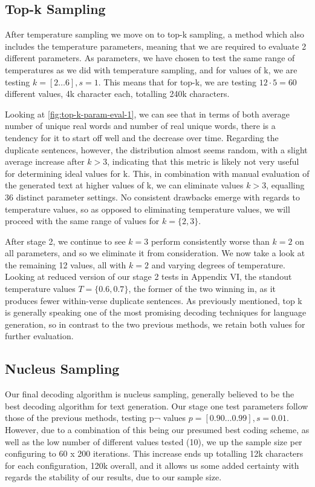 \subsection{Top-k Sampling}
\label{sec:tuningtopk}

After temperature sampling we move on to top-k sampling, a method which also includes the temperature parameters, meaning that we are required to evaluate 2 different parameters. As parameters, we have chosen to test the same range of temperatures as we did with temperature sampling, and for values of k, we are testing $k=[2 \ldots 6],s=1$. This means that for top-k, we are testing $12 \cdot 5 = 60$ different values, 4k character each, totalling 240k characters.

Looking at \cref{fig:top-k-param-eval-1}, we can see that in terms of both average number of unique real words and number of real unique words, there is a tendency for it to start off well and the decrease over time. Regarding the duplicate sentences, however, the distribution almost seems random, with a slight average increase after $k>3$, indicating that this metric is likely not very useful for determining ideal values for k. This, in combination with manual evaluation of the generated text at higher values of k, we can eliminate values $k>3$, equalling 36 distinct parameter settings. No consistent drawbacks emerge with regards to temperature values, so as opposed to eliminating temperature values, we will proceed with the same range of values for $k=\{2,3\}$.

After stage 2, we continue to see $k=3$ perform consistently worse than $k=2$ on all parameters, and so we eliminate it from consideration. We now take a look at the remaining 12 values, all with $k=2$ and varying degrees of temperature. Looking at reduced version of our stage 2 tests in Appendix VI, the standout temperature values $T=\{0.6,0.7\}$, the former of the two winning in, as it produces fewer within-verse duplicate sentences. As previously mentioned, top k is generally speaking one of the most promising decoding techniques for language generation, so in contrast to the two previous methods, we retain both values for further evaluation.

\subsection{Nucleus Sampling}
\label{sec:tuningnucleus}

Our final decoding algorithm is nucleus sampling, generally believed to be the best decoding algorithm for text generation. Our stage one test parameters follow those of the previous methods, testing p¬ values $p=[0.90 \ldots 0.99],s=0.01$. However, due to a combination of this being our presumed best coding scheme, as well as the low number of different values tested (10), we up the sample size per configuring to  60 x 200 iterations. This increase ends up totalling 12k characters for each configuration, 120k overall, and it allows us some added certainty with regards the stability of our results, due to our sample size.

